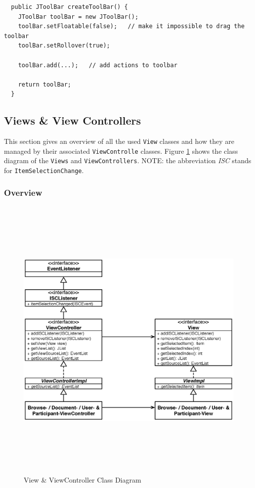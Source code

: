 \begin{verbatim}
  public JToolBar createToolBar() {
    JToolBar toolBar = new JToolBar();
    toolBar.setFloatable(false);   // make it impossible to drag the toolbar
    toolBar.setRollover(true);

    toolBar.add(...);   // add actions to toolbar

    return toolBar;
  }
\end{verbatim}

\subsection{Views \& View Controllers}
This section gives an overview of all the used \texttt{View} classes and how they are managed by their associated \texttt{View\-Controlle} classes. Figure \ref{application_views_controllers} shows the class diagram of the \texttt{Views} and \texttt{ViewControllers}. NOTE: the abbreviation \emph{ISC} stands for \texttt{Item\-Selection\-Change}.

\subsubsection{Overview}
\begin{figure}[H]
\begin{center}
  \includegraphics[height=5.62in, width=7.19in]{../images/finalreport/application_views_controllers.eps}
\caption{View \& ViewController Class Diagram}
\label{application_views_controllers}
\end{center}
\end{figure}

